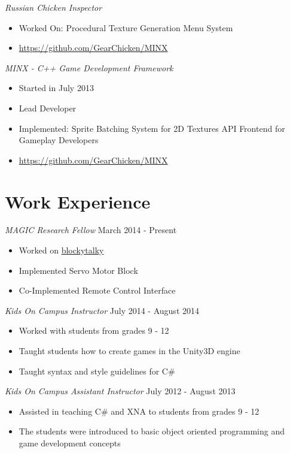 \documentclass[line,margin]{res}
\begin{document}
\begin{resume}
{\sl Russian Chicken
Inspector}
\begin{itemize}
\itemsep1pt\parskip0pt
\item
Worked On:
\subitem
Procedural Texture Generation
\subitem
Menu System
\item
\url {https://github.com/GearChicken/MINX}
\end{itemize}

{\sl MINX - C++ Game Development
Framework}
\begin{itemize}
\itemsep1pt\parskip0pt
\item
Started in July 2013
\item Lead Developer
\item Implemented:
\subitem Sprite Batching System for 2D Textures
\subitem API Frontend for Gameplay Developers
\item
\url{https://github.com/GearChicken/MINX}
\end{itemize}


\section{Work Experience}

{\sl MAGIC Research Fellow} \hfill March 2014 - Present
\begin{itemize}
\itemsep1pt\parskip0pt
\item
  Worked on
  \href{https://github.com/liam-middlebrook/blockytalky.git}{blockytalky}
\item
  Implemented Servo Motor Block
\item
  Co-Implemented Remote Control Interface
\end{itemize}

{\sl Kids On Campus Instructor} \hfill July 2014 - August 2014
\begin{itemize}
\itemsep1pt\parskip0pt
\item
  Worked with students from grades 9 - 12
\item
  Taught students how to create games in the Unity3D engine
\item
  Taught syntax and style guidelines for C\#
\end{itemize}

{\sl Kids On Campus Assistant Instructor} \hfill July 2012 - August 2013
\begin{itemize}
\itemsep1pt\parskip0pt
\item
  Assisted in teaching C\# and XNA to students from grades 9 - 12
\item
  The students were introduced to basic object oriented programming and
  game development concepts
\end{itemize}



\end{resume}
\end{document}
